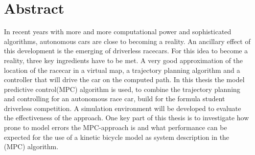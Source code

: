 \chapter*{Abstract}
In recent years with more and more computational power and sophisticated algorithms, autonomous cars are close to becoming a reality. An ancillary effect of this development is the emerging of driverless racecars. For this idea to become a reality, three key ingredients have to be met. A very good approximation of the location of the racecar in a virtual map, a trajectory planning algorithm and a controller that will drive the car on the computed path. In this thesis the model predictive control(MPC) algorithm is used, to combine the trajectory planning and controlling for an autonomous race car, build for the formula student driverless competition. A simulation environment will be developed to evaluate the effectiveness of the approach. One key part of this thesis is to investigate how prone to model errors the MPC-approach is and what performance can be expected for the use of a kinetic bicycle model as system description in the (MPC) algorithm.